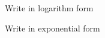 \documentclass[fleqn,addpoints]{exam}
\begin{document}
  \begin{questions}

    \question Write in logarithm form

    \question Write in exponential form







\end{questions}
\end{document}
